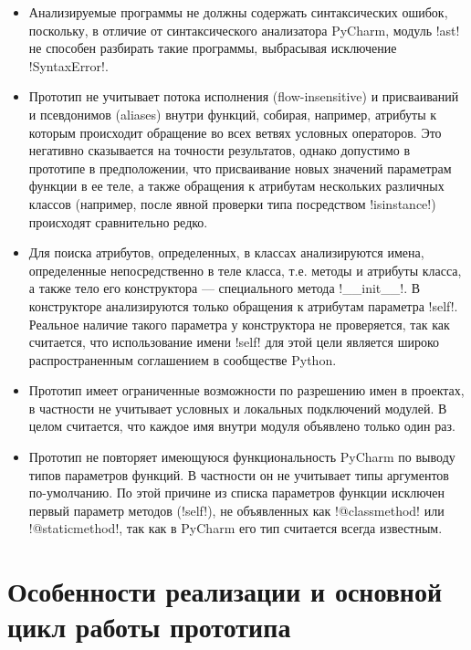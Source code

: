 \begin{itemize} 
  \item Анализируемые программы не должны содержать синтаксических ошибок,
    поскольку, в отличие от синтаксического анализатора PyCharm, модуль !ast! не
    способен разбирать такие программы, выбрасывая исключение !SyntaxError!.

  \item Прототип не учитывает потока исполнения (flow-insensitive) и
    присваиваний и псевдонимов (aliases) внутри функций, собирая, например,
    атрибуты к которым происходит обращение во всех ветвях условных операторов.
    Это негативно сказывается на точности результатов, однако допустимо в
    прототипе в предположении, что присваивание новых значений параметрам
    функции в ее теле, а также обращения к атрибутам нескольких различных
    классов (например, после явной проверки типа посредством !isinstance!)
    происходят сравнительно редко.

  \item Для поиска атрибутов, определенных, в классах анализируются имена,
    определенные непосредственно в теле класса, т.е. методы и атрибуты
    класса, а также тело его конструктора --- специального метода !__init__!. В
    конструкторе анализируются только обращения к атрибутам параметра !self!.
    Реальное наличие такого параметра у конструктора не проверяется, так как
    считается, что использование имени !self! для этой цели является широко
    распространенным соглашением в сообществе Python.

  \item Прототип имеет ограниченные возможности по разрешению имен в проектах, в
    частности не учитывает условных и локальных подключений модулей. В целом
    считается, что каждое имя внутри модуля объявлено только один раз.

  \item Прототип не повторяет имеющуюся функциональность PyCharm по выводу
    типов параметров функций. В частности он не учитывает типы
    аргументов по-умолчанию. По этой причине из списка параметров функции
    исключен первый параметр методов (!self!), не объявленных как !@classmethod!
    или !@staticmethod!, так как в PyCharm его тип считается всегда известным.

\end{itemize}



\section{Особенности реализации и основной цикл работы прототипа}
\label{sec:prototype-architecture}

